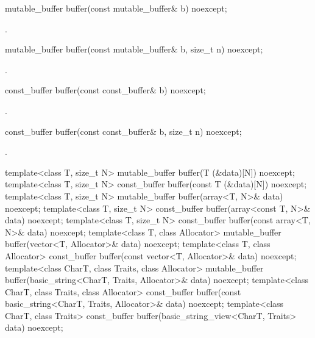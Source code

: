 \begin{itemdecl}
mutable_buffer buffer(const mutable_buffer& b) noexcept;
\end{itemdecl}

\begin{itemdescr}
\pnum
\returns {}.
\end{itemdescr}

\begin{itemdecl}
mutable_buffer buffer(const mutable_buffer& b, size_t n) noexcept;
\end{itemdecl}

\begin{itemdescr}
\pnum
\returns {}.
\end{itemdescr}

\begin{itemdecl}
const_buffer buffer(const const_buffer& b) noexcept;
\end{itemdecl}

\begin{itemdescr}
\pnum
\returns {}.
\end{itemdescr}

\begin{itemdecl}
const_buffer buffer(const const_buffer& b, size_t n) noexcept;
\end{itemdecl}

\begin{itemdescr}
\pnum
\returns {}.
\end{itemdescr}

\begin{itemdecl}
template<class T, size_t N>
  mutable_buffer buffer(T (&data)[N]) noexcept;
template<class T, size_t N>
  const_buffer buffer(const T (&data)[N]) noexcept;
template<class T, size_t N>
  mutable_buffer buffer(array<T, N>& data) noexcept;
template<class T, size_t N>
  const_buffer buffer(array<const T, N>& data) noexcept;
template<class T, size_t N>
  const_buffer buffer(const array<T, N>& data) noexcept;
template<class T, class Allocator>
  mutable_buffer buffer(vector<T, Allocator>& data) noexcept;
template<class T, class Allocator>
  const_buffer buffer(const vector<T, Allocator>& data) noexcept;
template<class CharT, class Traits, class Allocator>
  mutable_buffer buffer(basic_string<CharT, Traits, Allocator>& data) noexcept;
template<class CharT, class Traits, class Allocator>
  const_buffer buffer(const basic_string<CharT, Traits, Allocator>& data) noexcept;
template<class CharT, class Traits>
  const_buffer buffer(basic_string_view<CharT, Traits> data) noexcept;
\end{itemdecl}

